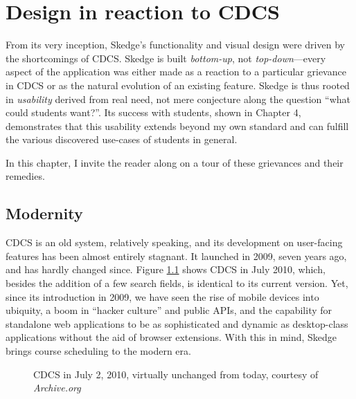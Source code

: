 
\chapter{Design in reaction to CDCS}

From its very inception, Skedge's functionality and visual design were driven by the shortcomings of CDCS. Skedge is built \emph{bottom-up}, not \emph{top-down}---every aspect of the application was either made as a reaction to a particular grievance in CDCS or as the natural evolution of an existing feature. Skedge is thus rooted in \emph{usability} derived from real need, not mere conjecture along the question ``what could students want?''. Its success with students, shown in Chapter 4, demonstrates that this usability extends beyond my own standard and can fulfill the various discovered use-cases of students in general.

In this chapter, I invite the reader along on a tour of these grievances and their remedies.


\section{Modernity}

CDCS is an old system, relatively speaking, and its development on user-facing features has been almost entirely stagnant. It launched in 2009, seven years ago, and has hardly changed since. Figure \ref{fig:cdcs2010} shows CDCS in July 2010, which, besides the addition of a few search fields, is identical to its current version. Yet, since its introduction in 2009, we have seen the rise of mobile devices into ubiquity, a boom in ``hacker culture'' and public APIs, and the capability for standalone web applications to be as sophisticated and dynamic as desktop-class applications without the aid of browser extensions. With this in mind, Skedge brings course scheduling to the modern era.

\begin{figure}[ht]
  \centering
  \caption{CDCS in July 2, 2010, virtually unchanged from today, courtesy of \emph{Archive.org}}
  \label{fig:cdcs2010}
\end{figure}

